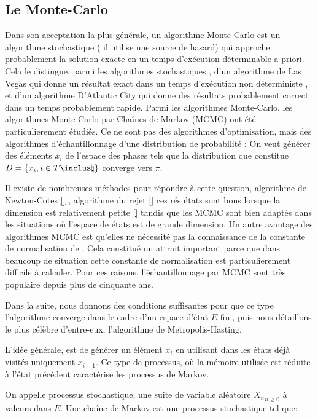 \subsection{Le Monte-Carlo}
\label{sub:MC}
Dans son acceptation la plus générale, un algorithme Monte-Carlo est un algorithme stochastique ( il utilise une source de hasard) qui approche probablement la solution exacte en un temps d'exécution déterminable a priori. Cela le distingue, parmi les algorithmes stochastiques , d'un algorithme de Las Vegas qui donne un résultat exact dans un temps d'exécution non déterministe , et d'un algorithme D'Atlantic City qui donne des résultats probablement correct dans un temps probablement rapide.
Parmi les algorithmes Monte-Carlo, les algorithmes Monte-Carlo par Chaînes de Markov (MCMC) ont été particulierement étudiés.
Ce ne sont pas des algorithmes d'optimisation, mais des algorithmes d'échantillonnage d'une distribution de probabilité \pi: On veut générer des éléments $x_i$ de l'espace des phases tels que la distribution que constitue $D=\{x_i, i \in T \inclus \natural\}$ converge vers $\pi$.

Il existe de nombreuses méthodes pour répondre à cette question, algorithme de Newton-Cotes \ref{} , algorithme du rejet \ref{} ces résultats sont bons lorsque la dimension est relativement petite \ref{} tandis que les MCMC sont bien adaptés dans les situations où l'espace de états est de grande dimension. Un autre avantage des algorithmes MCMC est qu'elles ne nécessité pas la connaissance de la constante de normalisation de \pi. Cela constitué un attrait important parce que dans beaucoup de situation cette constante de normalisation est particulierement difficile à calculer. Pour ces raisons, l'échantillonnage par MCMC sont très populaire depuis plus de cinquante ans.

Dans la suite, nous donnons des conditions suffisantes pour que ce type l'algorithme converge dans le cadre d'un espace d'état $E$ fini, puis nous détaillons le plus célèbre d'entre-eux, l'algorithme de Metropolis-Hasting.

L'idée générale, est de générer un élément $x_i$ en utilisant dans les états déjà visités uniquement $x_{i-1}$. Ce type de processus, où la mémoire utilisée est réduite à l'état précédent caractérise les processus de Markov.


On appelle processus stochastique, une suite de variable aléatoire ${X_n}_{n\geq 0}$ à valeurs dans $E$.
Une chaîne de Markov est une processus stochastique tel que:


